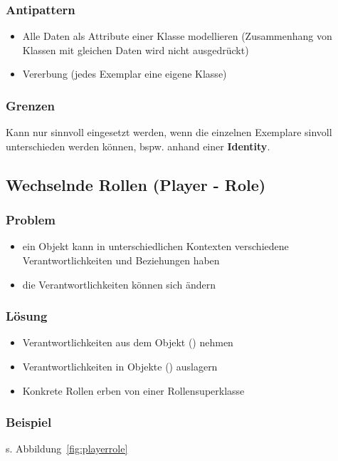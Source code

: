 \subsubsection*{Antipattern}
\begin{itemize}
    \item Alle Daten als Attribute einer Klasse modellieren (Zusammenhang von Klassen mit gleichen Daten wird nicht ausgedrückt)
    \item Vererbung (jedes Exemplar eine eigene Klasse)
\end{itemize}


\subsubsection*{Grenzen}
Kann nur sinnvoll eingesetzt werden, wenn die einzelnen Exemplare sinvoll unterschieden werden können, bspw. anhand einer \textbf{Identity}.



\subsection{Wechselnde Rollen (Player - Role)}

\subsubsection*{Problem}
\begin{itemize}
    \item ein Objekt kann in unterschiedlichen Kontexten verschiedene Verantwortlichkeiten und Beziehungen haben
    \item die Verantwortlichkeiten können sich ändern
\end{itemize}

\subsubsection*{Lösung}
\begin{itemize}
    \item Verantwortlichkeiten aus dem Objekt () nehmen
    \item Verantwortlichkeiten in Objekte () auslagern
    \item Konkrete Rollen erben von einer Rollensuperklasse
\end{itemize}

\subsubsection*{Beispiel}
s. Abbildung~\ref{fig:playerrole}


